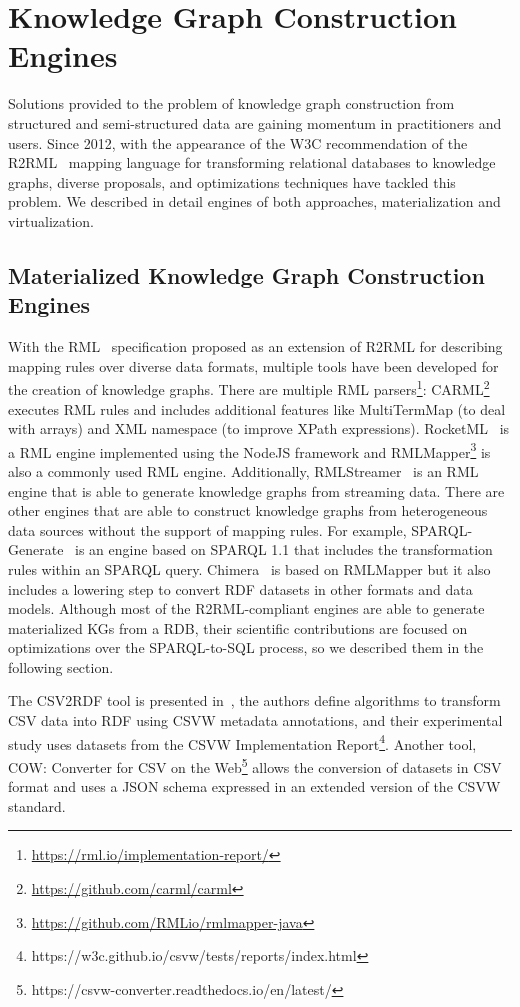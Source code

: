 \section{Knowledge Graph Construction Engines}
\label{sec:soa_engines}
Solutions provided to the problem of knowledge graph construction from structured and semi-structured data are gaining momentum in practitioners and users. Since 2012, with the appearance of the W3C recommendation of the R2RML~\citep{R2RML} mapping language for transforming relational databases to knowledge graphs, diverse proposals, and optimizations techniques have tackled this problem. We described in detail engines of both approaches, materialization and virtualization.

\subsection{Materialized Knowledge Graph Construction Engines}
With the RML~\citep{dimou2014rml} specification proposed as an extension of R2RML for describing mapping rules over diverse data formats, multiple tools have been developed for the creation of knowledge graphs. There are multiple RML parsers\footnote{\url{https://rml.io/implementation-report/}}: CARML\footnote{\url{https://github.com/carml/carml}} executes RML rules and includes additional features like MultiTermMap (to deal with arrays) and XML namespace (to improve XPath expressions). RocketML~\citep{csimcsek2019rocketrml} is a RML engine implemented using the NodeJS framework and RMLMapper\footnote{\url{https://github.com/RMLio/rmlmapper-java}} is also a commonly used RML engine. Additionally, RMLStreamer~\citep{haesendonck2019parallel} is an RML engine that is able to generate knowledge graphs from streaming data. There are other engines that are able to construct knowledge graphs from heterogeneous data sources without the support of mapping rules. For example, SPARQL-Generate~\citep{lefranccois2017sparql} is an engine based on SPARQL 1.1 that includes the transformation rules within an SPARQL query. Chimera~\citep{scrocca2020turning} is based on RMLMapper but it also includes a lowering step to convert RDF datasets in other formats and data models. Although most of the R2RML-compliant engines are able to generate materialized KGs from a RDB, their scientific contributions are focused on optimizations over the SPARQL-to-SQL process, so we described them in the following section.

The CSV2RDF tool is presented in~\citep{Mahmud2018}, the authors define algorithms to transform CSV data into RDF using CSVW metadata annotations, and their experimental study uses datasets from the CSVW Implementation Report\footnote{https://w3c.github.io/csvw/tests/reports/index.html}. Another tool, COW: Converter for CSV on the Web\footnote{https://csvw-converter.readthedocs.io/en/latest/} allows the conversion of datasets in CSV format and uses a JSON schema expressed in an extended version of the CSVW standard. 

